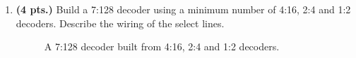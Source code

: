 \begin{enumerate}
\item {\bf (4 pts.)} Build a 7:128 decoder using a minimum number of 
4:16, 2:4 and 1:2 decoders. Describe the wiring of the select lines.
\begin{solution} {

\begin{figure}[ht]
\caption{A 7:128 decoder built from 4:16, 2:4 and 1:2 decoders.}
\label{fig:bighwdec}
\end{figure}
} \end{solution}




\end{enumerate}
